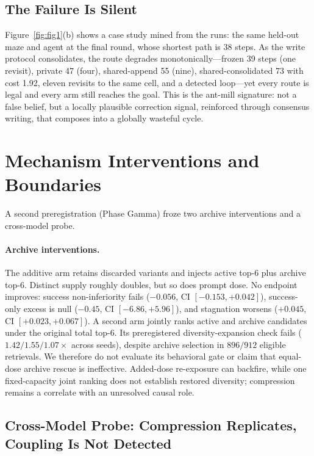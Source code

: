 \documentclass[letterpaper]{article} %
\begin{document}
\subsection{The Failure Is Silent}

Figure~\ref{fig:fig1}(b) shows a case study mined from the runs: the same held-out maze and
agent at the final round, whose shortest path is 38 steps. As the write protocol
consolidates, the route degrades monotonically---frozen 39 steps (one revisit), private 47
(four), shared-append 55 (nine), shared-consolidated 73 with cost 1.92, eleven revisits to
the same cell, and a detected loop---yet every route is legal and every arm still reaches the
goal. This is the ant-mill signature: not a false belief, but a locally plausible correction
signal, reinforced through consensus writing, that composes into a globally wasteful cycle.

\section{Mechanism Interventions and Boundaries}\label{sec:gamma}

A second preregistration (Phase Gamma) froze two archive interventions and a cross-model
probe.

\paragraph{Archive interventions.}
The additive arm retains discarded variants and injects active top-6 plus archive top-6.
Distinct supply roughly doubles, but so does prompt dose. No endpoint improves: success
non-inferiority fails ($-0.056$, CI $[-0.153,+0.042]$), success-only excess is null
($-0.45$, CI $[-6.86,+5.96]$), and stagnation worsens ($+0.045$, CI
$[+0.023,+0.067]$). A second arm jointly ranks active and archive candidates under the
original total top-6. Its preregistered diversity-expansion check fails
($1.42/1.55/1.07\times$ across seeds), despite archive selection in $896/912$ eligible
retrievals. We therefore do not evaluate its behavioral gate or claim that equal-dose
archive rescue is ineffective. Added-dose re-exposure can backfire, while one fixed-capacity
joint ranking does not establish restored diversity; compression remains a correlate with an
unresolved causal role.

\subsection{Cross-Model Probe: Compression Replicates, Coupling Is Not Detected}
\end{document}
